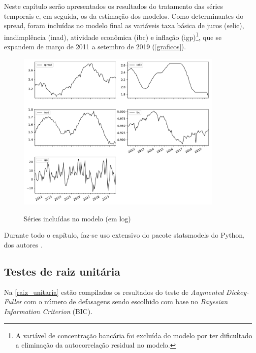 \documentclass[a4paper,
               article,
               12pt,
               openany,
               oneside,
               english,
               brazil]{abntex2}
\numberwithin{equation}{section}
\begin{document}
   Neste capítulo serão apresentados os resultados do tratamento das séries temporais e, em seguida, os da estimação dos modelos. Como determinantes do spread, foram incluídas no modelo final as variáveis taxa básica de juros (selic), inadimplência (inad), atividade econômica (ibc) e inflação (igp)\footnote{A variável de concentração bancária foi excluída do modelo por ter dificultado a eliminação da autocorrelação residual no modelo.}, que se expandem de março de 2011 a setembro de 2019 (\autoref{graficos}).

    \begin{figure}[h]
        \centering
        \caption{Séries incluídas no modelo (em log)}
        \includegraphics[width = 0.9\textwidth, scale=1]{series_modelo.pdf}
        \label{graficos}
    \end{figure}

   Durante todo o capítulo, faz-se uso extensivo do pacote statsmodels do Python, dos autores \textcite{statsmodels}.

   \subsection{Testes de raiz unitária}
   
   Na \autoref{raiz_unitaria} estão compilados os resultados do teste de \textit{Augmented Dickey-Fuller} com o número de defasagens sendo escolhido com base no \textit{Bayesian Information Criterion} (BIC).
\end{document}
